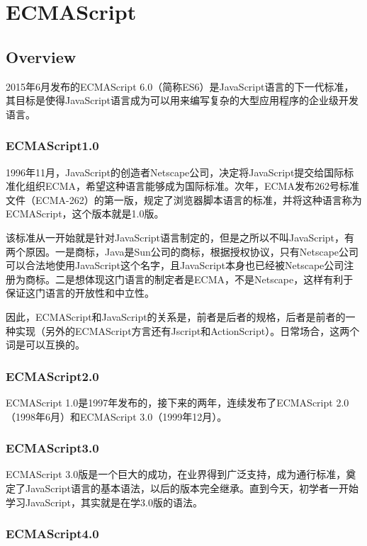 \part{ECMAScript}

\chapter{Overview}


2015年6月发布的ECMAScript 6.0（简称ES6）是JavaScript语言的下一代标准，其目标是使得JavaScript语言成为可以用来编写复杂的大型应用程序的企业级开发语言。

\section{ECMAScript1.0}


1996年11月，JavaScript的创造者Netscape公司，决定将JavaScript提交给国际标准化组织ECMA，希望这种语言能够成为国际标准。次年，ECMA发布262号标准文件（ECMA-262）的第一版，规定了浏览器脚本语言的标准，并将这种语言称为ECMAScript，这个版本就是1.0版。

该标准从一开始就是针对JavaScript语言制定的，但是之所以不叫JavaScript，有两个原因。一是商标，Java是Sun公司的商标，根据授权协议，只有Netscape公司可以合法地使用JavaScript这个名字，且JavaScript本身也已经被Netscape公司注册为商标。二是想体现这门语言的制定者是ECMA，不是Netscape，这样有利于保证这门语言的开放性和中立性。

因此，ECMAScript和JavaScript的关系是，前者是后者的规格，后者是前者的一种实现（另外的ECMAScript方言还有Jscript和ActionScript）。日常场合，这两个词是可以互换的。

\section{ECMAScript2.0}


ECMAScript 1.0是1997年发布的，接下来的两年，连续发布了ECMAScript 2.0（1998年6月）和ECMAScript 3.0（1999年12月）。


\section{ECMAScript3.0}

ECMAScript 3.0版是一个巨大的成功，在业界得到广泛支持，成为通行标准，奠定了JavaScript语言的基本语法，以后的版本完全继承。直到今天，初学者一开始学习JavaScript，其实就是在学3.0版的语法。

\section{ECMAScript4.0}

